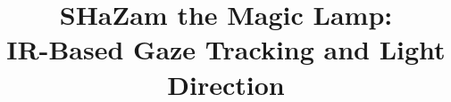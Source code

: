 \documentclass[conference, twocolumn]{IEEEtran}
\begin{document}
%



\title{SHaZam the Magic Lamp:\\IR-Based Gaze Tracking and Light Direction}



% 
\end{document}

